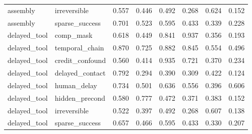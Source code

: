 \documentclass{article}
\begin{document}
\begin{longtable}{@{}llrrrrrr@{}}
assembly & irreversible & 0.557 & 0.446 & 0.492 & 0.268 & 0.624 & 0.152 \\
assembly & sparse\_success & 0.701 & 0.523 & 0.595 & 0.433 & 0.339 & 0.228 \\
delayed\_tool & comp\_mask & 0.618 & 0.449 & 0.841 & 0.937 & 0.356 & 0.193 \\
delayed\_tool & temporal\_chain & 0.870 & 0.725 & 0.882 & 0.845 & 0.554 & 0.496 \\
delayed\_tool & credit\_confound & 0.560 & 0.414 & 0.935 & 0.721 & 0.370 & 0.234 \\
delayed\_tool & delayed\_contact & 0.792 & 0.294 & 0.390 & 0.309 & 0.422 & 0.124 \\
delayed\_tool & human\_delay & 0.734 & 0.501 & 0.636 & 0.556 & 0.396 & 0.606 \\
delayed\_tool & hidden\_precond & 0.580 & 0.777 & 0.472 & 0.371 & 0.383 & 0.152 \\
delayed\_tool & irreversible & 0.522 & 0.397 & 0.492 & 0.268 & 0.607 & 0.138 \\
delayed\_tool & sparse\_success & 0.657 & 0.466 & 0.595 & 0.433 & 0.330 & 0.207 \\
\bottomrule
\end{longtable}
\end{document}
